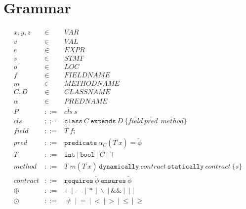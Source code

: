 \section{Grammar}

\newcommand{\code}{\texttt} %

\newcommand{\stararrow}{ - \! \ast \ }
\newcommand{\eif}[3]{\code{if} \ ( #1 ) \ \{ #2 \} \ \code{else} \ \{#3\}}
\newcommand{\tphi}{\widetilde{\phi}}
\newcommand{\alt}{ \ | \ }

\begin{spacing}{1.5}
\begin{align*}
\begin{array}{rcl}
%
%
x,y,z  &\in& \mathit{VAR} \\
v      &\in& \mathit{VAL} \\
e      &\in& \mathit{EXPR} \\
s      &\in& \mathit{STMT} \\
o      &\in& \mathit{LOC} \\
f      &\in& \mathit{FIELDNAME} \\
m      &\in& \mathit{METHODNAME} \\
C,D    &\in& \mathit{CLASSNAME} \\
\alpha &\in& \mathit{PREDNAME} \\
%
%
P                 &::=& \overline{cls} \ s \\
\mathit{cls}      &::=& \code{class} \ C \ \code{extends} \ D \ \{ \overline{\mathit{field}} \ \overline{\mathit{pred}} \ \overline{\ \mathit{method}} \} \\
\mathit{field}    &::=& T \ f; \\
\mathit{pred}     &::=& \code{predicate} \ \alpha_C(\overline{T \ x}) = \tphi \\
T                 &::=& \code{int} \alt \code{bool} \alt C \alt \top \\
\mathit{method}   &::=& T \ m (\overline{T \ x}) \ \code{dynamically} \ \mathit{contract} \ \code{statically} \ \mathit{contract} \ \{ s \} \\
\mathit{contract} &::=& \code{requires} \ \tphi \ \code{ensures} \ \tphi \\
\oplus            &::=& + \alt - \alt \ast \alt \backslash \alt \&\& \alt \mid\mid \\
\odot             &::=& \neq \alt = \alt < \alt > \alt \leq \alt \geq \\

\end{array}
\end{align*}
\end{spacing}
